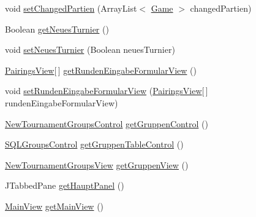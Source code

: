 \begin{DoxyCompactItemize}
\item 
void \hyperlink{classde_1_1turnierverwaltung_1_1control_1_1_main_control_a4d108efb9b70213c197679b7ad73474b}{set\+Changed\+Partien} (Array\+List$<$ \hyperlink{classde_1_1turnierverwaltung_1_1model_1_1_game}{Game} $>$ changed\+Partien)
\item 
Boolean \hyperlink{classde_1_1turnierverwaltung_1_1control_1_1_main_control_a424a884788e6b264ed36a99b2378ef5b}{get\+Neues\+Turnier} ()
\item 
void \hyperlink{classde_1_1turnierverwaltung_1_1control_1_1_main_control_a322a4f1376a6d56bd85d31feacf72967}{set\+Neues\+Turnier} (Boolean neues\+Turnier)
\item 
\hyperlink{classde_1_1turnierverwaltung_1_1view_1_1_pairings_view}{Pairings\+View}\mbox{[}$\,$\mbox{]} \hyperlink{classde_1_1turnierverwaltung_1_1control_1_1_main_control_a2f3860d729e0a435ef4d719b586edce6}{get\+Runden\+Eingabe\+Formular\+View} ()
\item 
void \hyperlink{classde_1_1turnierverwaltung_1_1control_1_1_main_control_a9cdd862d624e7dfded57c712ffd01f0f}{set\+Runden\+Eingabe\+Formular\+View} (\hyperlink{classde_1_1turnierverwaltung_1_1view_1_1_pairings_view}{Pairings\+View}\mbox{[}$\,$\mbox{]} runden\+Eingabe\+Formular\+View)
\item 
\hyperlink{classde_1_1turnierverwaltung_1_1control_1_1_new_tournament_groups_control}{New\+Tournament\+Groups\+Control} \hyperlink{classde_1_1turnierverwaltung_1_1control_1_1_main_control_a6a34893140d20a6f22f8a6b1a593715d}{get\+Gruppen\+Control} ()
\item 
\hyperlink{classde_1_1turnierverwaltung_1_1control_1_1_s_q_l_groups_control}{S\+Q\+L\+Groups\+Control} \hyperlink{classde_1_1turnierverwaltung_1_1control_1_1_main_control_adffaf74bb39853b8388887a9c281e79f}{get\+Gruppen\+Table\+Control} ()
\item 
\hyperlink{classde_1_1turnierverwaltung_1_1view_1_1_new_tournament_groups_view}{New\+Tournament\+Groups\+View} \hyperlink{classde_1_1turnierverwaltung_1_1control_1_1_main_control_ae71e39725bca7fe4b445e18868936b37}{get\+Gruppen\+View} ()
\item 
J\+Tabbed\+Pane \hyperlink{classde_1_1turnierverwaltung_1_1control_1_1_main_control_af821bb79fc3e96fc0c6458fe626b0db0}{get\+Haupt\+Panel} ()
\item 
\hyperlink{classde_1_1turnierverwaltung_1_1view_1_1_main_view}{Main\+View} \hyperlink{classde_1_1turnierverwaltung_1_1control_1_1_main_control_a6f71fabef16d92280e8a0fdc6756c6fa}{get\+Main\+View} ()
\item 

\end{DoxyCompactItemize}
